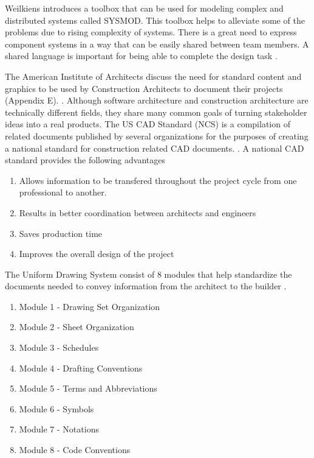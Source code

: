 \documentclass{acm_proc_article-sp}
\begin{document}
Weilkiens introduces a toolbox that can be used for modeling complex and distributed systems called SYSMOD. This toolbox helps to alleviate some of the problems due to rising complexity of systems. There is a great need to express component systems in a way that can be easily shared between team members. A shared language is important for being able to complete the design task \cite{Lamport:SysML}.

The American Institute of Architects discuss the need for standard content and graphics to be used by Construction Architects to document their projects (Appendix E). \cite{Lamport:AIA_Graphical_Standards}. Although software architecture and construction architecture are technically different fields, they share many common goals of turning stakeholder ideas into a real products.
\newline
The US CAD Standard (NCS) is a compilation of related documents published by several organizations for the purposes of creating a national standard for construction related CAD documents. \cite{Lamport:AIA_Graphical_Standards}.\newline
A national CAD standard provides the following advantages \cite{Lamport:AIA_Graphical_Standards}
\begin{enumerate}
	\item Allows information to be transfered throughout the project cycle from one professional to another.
	\item Results in better coordination between architects and engineers
	\item Saves production time
	\item Improves the overall design of the project
\end{enumerate}
The Uniform Drawing System consist of 8 modules that help standardize the documents needed to convey information from the architect to the builder \cite{Lamport:AIA_Graphical_Standards}.
\begin{enumerate}
	\item Module 1 - Drawing Set Organization
	\item Module 2 - Sheet Organization
	\item Module 3 - Schedules
	\item Module 4 - Drafting Conventions
	\item Module 5 - Terms and Abbreviations
	\item Module 6 - Symbols
	\item Module 7 - Notations
	\item Module 8 - Code Conventions
\end{enumerate}
\end{document}
